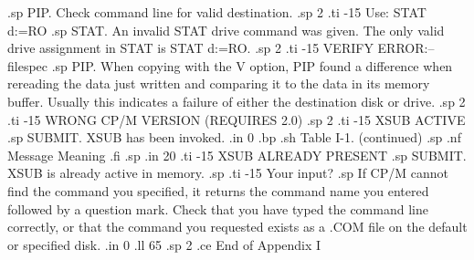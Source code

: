 .sp
PIP.  Check command line for valid destination.
.sp 2
.ti -15
Use: STAT d:=RO
.sp
STAT.  An invalid STAT drive command was given.  The only valid 
drive assignment in STAT is STAT d:=RO.
.sp 2
.ti -15
VERIFY ERROR:--{filespec}
.sp
PIP.  When copying with the V option, PIP found a difference when 
rereading the data just written and comparing it to the data in 
its memory buffer.  Usually this indicates a failure of either 
the destination disk or drive.
.sp 2
.ti -15
WRONG CP/M VERSION (REQUIRES 2.0)
.sp 2
.ti -15
XSUB ACTIVE
.sp
SUBMIT.  XSUB has been invoked.
.in 0
.bp
.sh
                     Table I-1.  (continued)
.sp
.nf
     Message        Meaning
.fi
.sp
.in 20
.ti -15
XSUB ALREADY PRESENT
.sp
SUBMIT.  XSUB is already active in memory.
.sp
.ti -15
Your input?
.sp
If CP/M cannot find the command you specified, it returns the 
command name you entered followed by a question mark.  Check that 
you have typed the command line correctly, or that the command 
you requested exists as a .COM file on the default or specified 
disk.
.in 0
.ll 65
.sp 2
.ce
End of Appendix I
